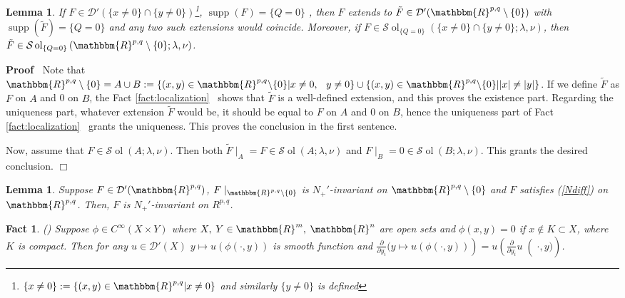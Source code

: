 \documentclass{article}
\newcommand{\assign}{:=}
\newcommand{\nin}{\not\in}
\newcommand{\tmop}[1]{\ensuremath{\operatorname{#1}}}
\renewenvironment{proof}{\noindent\textbf{Proof\ }}{\hspace*{\fill}$\Box$\medskip}
\newtheorem{lemma}[proposition]{Lemma}
\newtheorem{fact}[proposition]{Fact}
\theoremstyle{remark}
\newcommand{\D}{\mathcal{D}}
\newcommand{\supp}{\tmop{supp}}
\newcommand{\proofexplanation}[1]{(#1)}
\newcommand{\R}{\mathbbm{R}}
\begin{document}
\begin{lemma}
  \label{lem:sing-q-3}If $F \in \D' (\{ x \neq 0 \} \cap \{ y \neq 0
  \})$\footnote{$\{ x \neq 0 \} \assign \{ (x, y) \in \mathbbm{R}^{p, q} | x
  \neq 0 \}$ and similarly $\{ y \neq 0 \}$ is defined}, $\supp (F) = \{ Q = 0
  \}$ , then $F$ extends to $\tilde{F} \in \D' (\R^{p, q} \setminus \{ 0 \})$
  with $\supp (\tilde{F}) = \{ Q = 0 \}$ and any two such extensions would
  coincide. Moreover, if $F \in \mathcal{S} \tmop{ol}_{\{ Q = 0 \}} (\{ x \neq
  0 \} \cap \{ y \neq 0 \} ; \lambda, \nu)$, then $\tilde{F} \in \mathcal{S}
  \tmop{ol}_{\{ Q = 0 \}} \left( \R^{p, q} \setminus \{ 0 \} ; \lambda, \nu
  \right)$.
\end{lemma}

\begin{proof}
  Note that $\R^{p, q} \setminus \{ 0 \} = A \cup B \assign \{ (x, y) \in
  \R^{p, q} \backslash \{ 0 \} |x \neq 0, \hspace{0.75em} y \neq 0\} \cup \{
  (x, y) \in \R^{p, q} \backslash \{ 0 \} | | x | \neq | y | \}$. If we define
  $\tilde{F}$ as $F$ on $A$ and 0 on $B$, the Fact \ref{fact:localization} \
  shows that $\tilde{F}$ is a well-defined extension, and this proves the
  existence part. Regarding the uniqueness part, whatever extension
  $\tilde{F}$ would be, it should be equal to $F$ on $A$ and 0 on $B$, hence
  the uniqueness part of Fact \ref{fact:localization} \ grants the uniqueness.
  This proves the conclusion in the first sentence.
  
  Now, assume that $F \in \mathcal{S} \tmop{ol} (A ; \lambda, \nu)$. Then both
  $\tilde{F} \mid_A = F \in \mathcal{S} \tmop{ol} (A ; \lambda, \nu)$ and
  $F \mid_B = 0 \in \mathcal{S} \tmop{ol} (B ; \lambda, \nu)$. This grants
  the desired conclusion.
\end{proof}

\begin{lemma}
  \label{supp-Q:lem-sing-q-4}Suppose $F \in \D' (\R^{p, q})$, $F
  \mid_{\R^{p, q} \setminus \{ 0 \}}$ is $N_+'$-invariant on $\R^{p, q}
  \setminus \{ 0 \}$ and $F$ satisfies (\ref{Ndiff}) on $\R^{p, q}$. Then, $F$
  is $N_+'$-invariant on $R^{p, q}$.
\end{lemma}

\begin{fact}
\label{fact:sing-q-2}{\proofexplanation{{\cite[Thm
2.1.3]{hormander1983analysis}}}} Suppose $\phi \in C^{\infty}  (X \times Y)$
where $X, \hspace{0.25em} Y \in \R^m, \hspace{0.25em} \R^n$ are open sets and
$\phi (x, y) = 0$ if $x \nin K \subset X$, where $K$ is compact. Then for any
$u \in \D' (X)$ $y \mapsto u (\phi (\cdot, y))$ is smooth function and $\left.
\left. \frac{\partial}{\partial y_i}  (y \mapsto u (\phi (\cdot, y)) \right) =
u \left( \frac{\partial}{\partial y_i} u \right( \cdot, y)
\right)$.
\end{fact}
\end{document}

